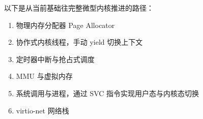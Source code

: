 
以下是从当前基础往完整微型内核推进的路径：

\begin{enumerate}
    \item 物理内存分配器 Page Allocator
    \item 协作式内核线程，手动 yield 切换上下文
    \item 定时器中断与抢占式调度
    \item MMU 与虚拟内存
    \item 系统调用与进程，通过 SVC 指令实现用户态与内核态切换
    \item virtio-net 网络栈
\end{enumerate}
